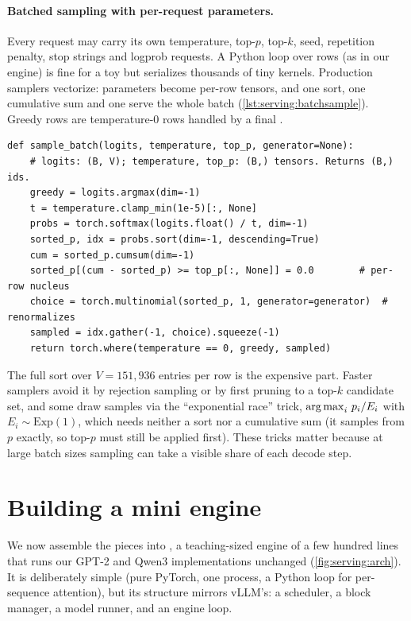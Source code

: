 \paragraph{Batched sampling with per-request parameters.} Every request may carry its own temperature,
top-$p$, top-$k$, seed, repetition penalty, stop strings and logprob requests. A Python loop over rows (as in our
engine) is fine for a toy but serializes thousands of tiny kernels. Production samplers vectorize: parameters
become per-row tensors, and one sort, one cumulative sum and one  serve the whole batch
(\cref{lst:serving:batchsample}). Greedy rows are temperature-0 rows handled by a final .

\begin{lstlisting}[caption={Vectorized sampling with per-row temperature and top-p.},label={lst:serving:batchsample}]
def sample_batch(logits, temperature, top_p, generator=None):
    # logits: (B, V); temperature, top_p: (B,) tensors. Returns (B,) ids.
    greedy = logits.argmax(dim=-1)
    t = temperature.clamp_min(1e-5)[:, None]
    probs = torch.softmax(logits.float() / t, dim=-1)
    sorted_p, idx = probs.sort(dim=-1, descending=True)
    cum = sorted_p.cumsum(dim=-1)
    sorted_p[(cum - sorted_p) >= top_p[:, None]] = 0.0        # per-row nucleus
    choice = torch.multinomial(sorted_p, 1, generator=generator)  # renormalizes
    sampled = idx.gather(-1, choice).squeeze(-1)
    return torch.where(temperature == 0, greedy, sampled)
\end{lstlisting}

The full sort over $V=151{,}936$ entries per row is the expensive part. Faster samplers avoid it by
rejection sampling or by first pruning to a top-$k$ candidate set, and some draw samples via the
``exponential race'' trick, $\operatorname*{arg\,max}_i\, p_i/E_i$ with $E_i\sim\text{Exp}(1)$, which needs neither a sort
nor a cumulative sum (it samples from $p$ exactly, so top-$p$ must still be applied first). These tricks
matter because at large batch sizes sampling can take a visible share of each decode step.

\section{Building a mini engine}\label{sec:serving:engine}

We now assemble the pieces into , a teaching-sized engine of a few hundred lines
that runs our GPT-2 and Qwen3 implementations unchanged (\cref{fig:serving:arch}). It is deliberately
simple (pure PyTorch, one process, a Python loop for per-sequence attention), but its structure mirrors
vLLM's: a scheduler, a block manager, a model runner, and an engine loop.

